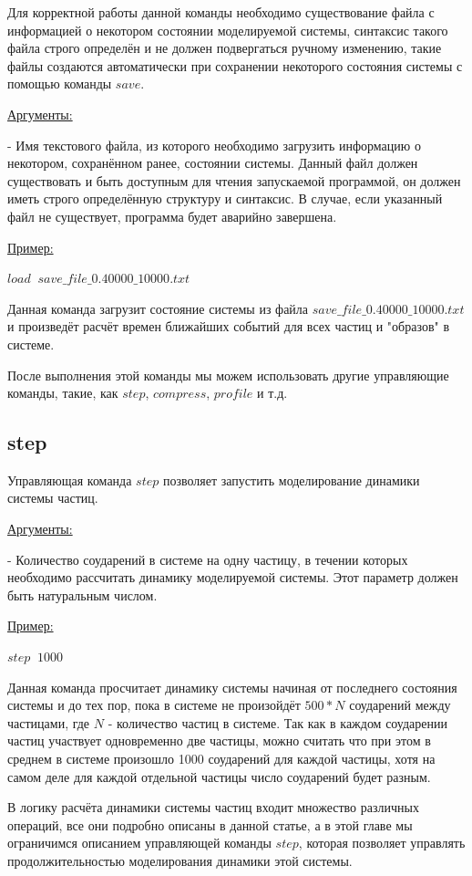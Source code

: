 \documentclass{article}
\begin{document}
Для корректной работы данной команды необходимо существование файла с информацией о некотором состоянии моделируемой системы, синтаксис такого файла строго определён и не должен подвергаться ручному изменению, такие файлы создаются автоматически при сохранении некоторого состояния системы с помощью команды $ save $.

\uline{Аргументы:}

- Имя текстового файла, из которого необходимо загрузить информацию о некотором, сохранённом ранее, состоянии системы. Данный файл должен существовать и быть доступным для чтения запускаемой программой, он должен иметь строго определённую структуру и синтаксис. В случае, если указанный файл не существует, программа будет аварийно завершена.

\uline{Пример:}

$ load \;\; save\_file\_0.40000\_10000.txt $

Данная команда загрузит состояние системы из файла $ save\_file\_0.40000\_10000.txt $ и произведёт расчёт времен ближайших событий для всех частиц и "образов" в системе.

После выполнения этой команды мы можем использовать другие управляющие команды, такие, как $ step $, $ compress $, $ profile $ и т.д.

\subsection{step}
Управляющая команда $ step $ позволяет запустить моделирование динамики системы частиц.

\uline{Аргументы:}

- Количество соударений в системе на одну частицу, в течении которых необходимо рассчитать динамику моделируемой системы. Этот параметр должен быть натуральным числом.

\uline{Пример:}

$ step \;\; 1000 $

Данная команда просчитает динамику системы начиная от последнего состояния системы и до тех пор, пока в системе не произойдёт $ 500*N $ соударений между частицами, где $ N $ - количество частиц в системе. Так как в каждом соударении частиц участвует одновременно две частицы, можно считать что при этом в среднем в системе произошло 1000 соударений для каждой частицы, хотя на самом деле для каждой отдельной частицы число соударений будет разным.

В логику расчёта динамики системы частиц входит множество различных операций, все они подробно описаны в данной статье, а в этой главе мы ограничимся описанием управляющей команды $ step $, которая позволяет управлять продолжительностью моделирования динамики этой системы.
\end{document}

